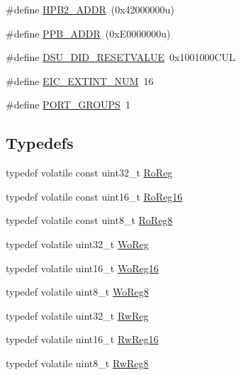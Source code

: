 \begin{DoxyCompactItemize}
\item 
\#define \mbox{\hyperlink{group___s_a_m_d21_e16_a__definitions_gaef42fa53ddf169a2a50be70d29f73571}{H\+P\+B2\+\_\+\+A\+D\+DR}}~(0x42000000u)
\item 
\#define \mbox{\hyperlink{group___s_a_m_d21_e16_a__definitions_ga8895d0a3a9a3126cc44330f86c8ce564}{P\+P\+B\+\_\+\+A\+D\+DR}}~(0x\+E0000000u)
\item 
\#define \mbox{\hyperlink{group___s_a_m_d21_e16_a__definitions_gada75131d542c9e1966238f5488f89bd6}{D\+S\+U\+\_\+\+D\+I\+D\+\_\+\+R\+E\+S\+E\+T\+V\+A\+L\+UE}}~0x1001000\+C\+UL
\item 
\#define \mbox{\hyperlink{group___s_a_m_d21_e16_a__definitions_ga88ebc38c95506296f5d21f82476296ae}{E\+I\+C\+\_\+\+E\+X\+T\+I\+N\+T\+\_\+\+N\+UM}}~16
\item 
\#define \mbox{\hyperlink{group___s_a_m_d21_e16_a__definitions_gab9243ffe03a1dc631b57a495b4b3d467}{P\+O\+R\+T\+\_\+\+G\+R\+O\+U\+PS}}~1
\end{DoxyCompactItemize}
\subsection*{Typedefs}
\begin{DoxyCompactItemize}
\item 
typedef volatile const uint32\+\_\+t \mbox{\hyperlink{group___s_a_m_d21_e16_a__definitions_ga5d556f8391af4141be23f7334ac9dd68}{Ro\+Reg}}
\item 
typedef volatile const uint16\+\_\+t \mbox{\hyperlink{group___s_a_m_d21_e16_a__definitions_gaebf6e33c2d49a802e06e22a95ea9d0d0}{Ro\+Reg16}}
\item 
typedef volatile const uint8\+\_\+t \mbox{\hyperlink{group___s_a_m_d21_e16_a__definitions_ga0d957f1433aaf5d70e4dc2b68288442d}{Ro\+Reg8}}
\item 
typedef volatile uint32\+\_\+t \mbox{\hyperlink{group___s_a_m_d21_e16_a__definitions_gac0f96d4e8018367b38f527007cf0eafd}{Wo\+Reg}}
\item 
typedef volatile uint16\+\_\+t \mbox{\hyperlink{group___s_a_m_d21_e16_a__definitions_ga0ab0e5f6c8301aa1c2068e511d854094}{Wo\+Reg16}}
\item 
typedef volatile uint8\+\_\+t \mbox{\hyperlink{group___s_a_m_d21_e16_a__definitions_ga5e336e5a36ee12ebeafb021108e5275b}{Wo\+Reg8}}
\item 
typedef volatile uint32\+\_\+t \mbox{\hyperlink{group___s_a_m_d21_e16_a__definitions_gacf1496e3bbe303e55f627fc7558a68c7}{Rw\+Reg}}
\item 
typedef volatile uint16\+\_\+t \mbox{\hyperlink{group___s_a_m_d21_e16_a__definitions_gacce07556c80fc352ae607f225f19fed5}{Rw\+Reg16}}
\item 
typedef volatile uint8\+\_\+t \mbox{\hyperlink{group___s_a_m_d21_e16_a__definitions_gae361754be775bb192f85821d3ab33c17}{Rw\+Reg8}}
\end{DoxyCompactItemize}


